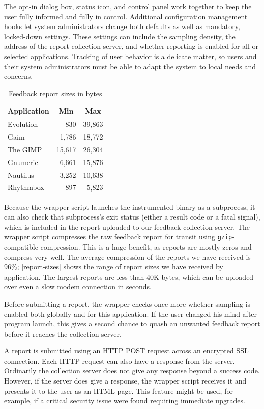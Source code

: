 \documentclass[10pt,twocolumn]{article}
\newcommand{\evolution}{Evolution\xspace}
\newcommand{\gaim}{Gaim\xspace}
\newcommand{\gimp}{The GIMP\xspace}
\newcommand{\gnumeric}{Gnumeric\xspace}
\newcommand{\nautilus}{Nautilus\xspace}
\newcommand{\rhythmbox}{Rhythmbox\xspace}
\newcommand{\header}[1]{\multicolumn{1}{c}{\textbf{#1}}}
\begin{document}
The opt-in dialog box, status icon, and control panel work together to
keep the user fully informed and fully in control.  Additional
configuration management hooks let system administrators change both
defaults as well as mandatory, locked-down settings.  These settings
can include the sampling density, the address of the report collection
server, and whether reporting is enabled for all or selected
applications.  Tracking of user behavior is a delicate matter, so
users and their system administrators must be able to adapt the system
to local needs and concerns.

\begin{table}
  \centering
  \begin{tabular}{lrr}
    \header{Application} & \header{Min} & \header{Max} \\ \hline
    \evolution & 830 & 39,863  \\
    \gaim & 1,786 & 18,772  \\
    \gimp & 15,617 & 26,304  \\
    \gnumeric & 6,661 & 15,876  \\
    \nautilus & 3,252 & 10,638  \\
    \rhythmbox & 897 & 5,823 
  \end{tabular}
  \caption{Feedback report sizes in bytes}
  \label{report-sizes}
\end{table}

Because the wrapper script launches the instrumented binary as a
subprocess, it can also check that subprocess's exit status (either a
result code or a fatal signal), which is included in the report
uploaded to our feedback collection server.
The wrapper script compresses the raw feedback report for transit
using \texttt{gzip}-compatible compression.  This is a huge benefit, as reports
are mostly zeros and compress very well.  The average compression
of the reports we have received is 96\%; \autoref{report-sizes} shows
the range of report sizes we have received by application.  
The largest reports are less than 40K bytes, which can be uploaded
over even a slow modem connection in seconds.

Before submitting a report, the wrapper checks once more whether
sampling is enabled both globally and for this application.  If the
user changed his mind after program launch, this gives a second chance
to quash an unwanted feedback report before it reaches the collection
server.

A report is submitted using an HTTP POST request across an encrypted SSL
connection.  Each HTTP request can also have a response from the server.
Ordinarily the collection server does not give any response beyond a
success code.  However, if the server does give a response, the
wrapper script receives it and presents it to the user as an HTML
page.  This feature might be used, for example, if a critical security
issue were found requiring immediate upgrades.  
\end{document}
